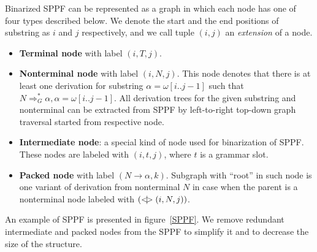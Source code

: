 Binarized SPPF can be represented as a graph in which each node has one of four types described below.
We denote the start and the end positions of substring as $i$ and $j$ respectively, and we call tuple $(i,j)$ an \textit{extension} of a node.

\begin{itemize}
    \item \textbf{Terminal node} with label $(i, T, j)$.
    \item \textbf{Nonterminal node} with label $(i, N, j)$. 
    This node denotes that there is at least one derivation for substring $\alpha=\omega[i..j-1]$ such that $N \Rightarrow^*_G \alpha, \alpha = \omega[i..j-1] $.
    All derivation trees for the given substring and nonterminal can be extracted from SPPF by left-to-right top-down graph traversal started from respective node.     
    \item \textbf{Intermediate node}: a special kind of node used for binarization of SPPF. These nodes are labeled with $(i,t,j)$, where $t$ is a grammar slot.
    \item \textbf{Packed node} with label $(N \rightarrow \alpha, k)$. 
    Subgraph with ``root'' in such node is one variant of derivation from nonterminal $N$ in case when the parent is a nonterminal node labeled with $(<\mkern-9mu | \mkern-9mu> (i, N, j))$.

\end{itemize}

An example of SPPF is presented in figure~\ref{SPPF}. We remove redundant intermediate and packed nodes from the SPPF to simplify it and to decrease the size of the structure.

